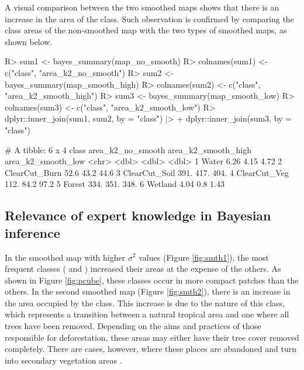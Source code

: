 \documentclass[
  shortnames]{jss}
\begin{document}
A visual comparison between the two smoothed maps shows that there is an increase in the area of the  class. Such observation is confirmed by comparing the class areas of the non-smoothed map with the two types of smoothed maps, as shown below.

\begin{CodeChunk}
\begin{CodeInput}
R> sum1 <- bayes_summary(map_no_smooth)
R> colnames(sum1) <- c("class", "area_k2_no_smooth")
R> sum2 <- bayes_summary(map_smooth_high)
R> colnames(sum2) <- c("class", "area_k2_smooth_high")
R> sum3 <- bayes_summary(map_smooth_low)
R> colnames(sum3) <- c("class", "area_k2_smooth_low")
R> dplyr::inner_join(sum1, sum2, by = "class") |>  
+   dplyr::inner_join(sum3, by = "class")
\end{CodeInput}
\begin{CodeOutput}
# A tibble: 6 x 4
  class         area_k2_no_smooth area_k2_smooth_high area_k2_smooth_low
  <chr>                     <dbl>               <dbl>              <dbl>
1 Water                      6.26                4.15               4.72
2 ClearCut_Burn             52.6                43.2               44.6 
3 ClearCut_Soil            391.                417.               404.  
4 ClearCut_Veg             112.                 84.2               97.2 
5 Forest                   334.                351.               348.  
6 Wetland                    4.04                0.8                1.43
\end{CodeOutput}
\end{CodeChunk}

\newpage

\hypertarget{relevance-of-expert-knowledge-in-bayesian-inference}{%
\subsection{Relevance of expert knowledge in Bayesian inference}\label{relevance-of-expert-knowledge-in-bayesian-inference}}

In the smoothed map with higher \(\sigma^2\) values (Figure \ref{fig:smth1}), the most frequent classes ( and ) increased their areas at the expense of the others. As shown in Figure \ref{fig:pcube}, these classes occur in more compact patches than the others. In the second smoothed map (Figure \ref{fig:smth2}), there is an increase in the area occupied by the  class. This increase is due to the nature of this class, which represents a transition between a natural tropical area and one where all trees have been removed. Depending on the aims and practices of those responsible for deforestation, these areas may either have their tree cover removed completely. There are cases, however, where these places are abandoned and turn into secondary vegetation areas \cite{Uhl1988, Wang2020}.
\end{document}
